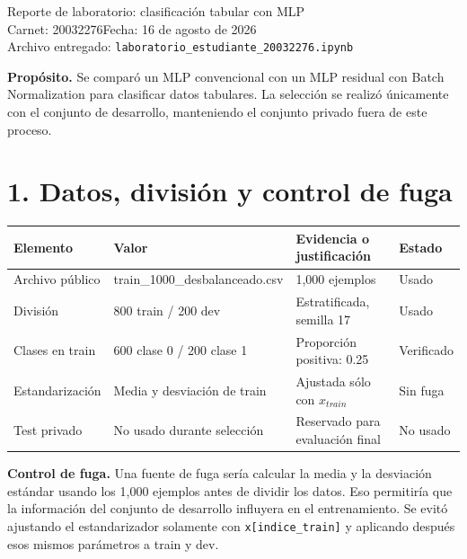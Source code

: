 \documentclass[10pt]{article}
\begin{document}
\begin{center}
{\LARGE Reporte de laboratorio: clasificación tabular con MLP}\\[0.4em]
Carnet: 20032276\hfill Fecha: 16 de agosto de 2026\\
Archivo entregado: \texttt{laboratorio\_estudiante\_20032276.ipynb}
\end{center}

\textbf{Propósito.} Se comparó un MLP convencional con un MLP residual con Batch Normalization para clasificar datos tabulares. La selección se realizó únicamente con el conjunto de desarrollo, manteniendo el conjunto privado fuera de este proceso.

\section*{1. Datos, división y control de fuga}
\begin{tabular}{@{}llll@{}}
\toprule
Elemento & Valor & Evidencia o justificación & Estado\\
\midrule
Archivo público & train\_1000\_desbalanceado.csv & 1,000 ejemplos & Usado\\
División & 800 train / 200 dev & Estratificada, semilla 17 & Usado\\
Clases en train & 600 clase 0 / 200 clase 1 & Proporción positiva: 0.25 & Verificado\\
Estandarización & Media y desviación de train & Ajustada sólo con $x_{train}$ & Sin fuga\\
Test privado & No usado durante selección & Reservado para evaluación final & No usado\\
\bottomrule
\end{tabular}

\vspace{0.6em}
\textbf{Control de fuga.} Una fuente de fuga sería calcular la media y la desviación estándar usando los 1,000 ejemplos antes de dividir los datos. Eso permitiría que la información del conjunto de desarrollo influyera en el entrenamiento. Se evitó ajustando el estandarizador solamente con \texttt{x[indice\_train]} y aplicando después esos mismos parámetros a train y dev.
\end{document}
